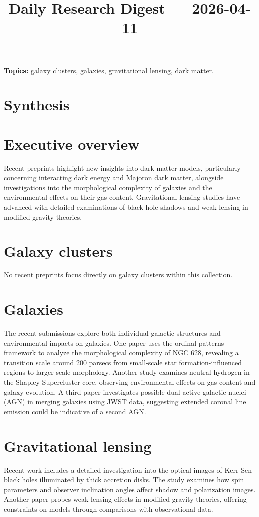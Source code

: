 \documentclass[11pt]{article}
\begin{document}
\title{Daily Research Digest --- 2026-04-11}
\author{}
\date{}
\maketitle
\textbf{Topics:} galaxy clusters, galaxies, gravitational lensing, dark matter.
\section*{Synthesis}
\section*{Executive overview}
Recent preprints highlight new insights into dark matter models, particularly concerning interacting dark energy and Majoron dark matter, alongside investigations into the morphological complexity of galaxies and the environmental effects on their gas content. Gravitational lensing studies have advanced with detailed examinations of black hole shadows and weak lensing in modified gravity theories.
\section*{Galaxy clusters}
No recent preprints focus directly on galaxy clusters within this collection.
\section*{Galaxies}
The recent submissions explore both individual galactic structures and environmental impacts on galaxies. One paper uses the ordinal patterns framework to analyze the morphological complexity of NGC 628, revealing a transition scale around 200 parsecs from small-scale star formation-influenced regions to larger-scale morphology. Another study examines neutral hydrogen in the Shapley Supercluster core, observing environmental effects on gas content and galaxy evolution. A third paper investigates possible dual active galactic nuclei (AGN) in merging galaxies using JWST data, suggesting extended coronal line emission could be indicative of a second AGN.
\section*{Gravitational lensing}
Recent work includes a detailed investigation into the optical images of Kerr-Sen black holes illuminated by thick accretion disks. The study examines how spin parameters and observer inclination angles affect shadow and polarization images. Another paper probes weak lensing effects in modified gravity theories, offering constraints on models through comparisons with observational data.
\end{document}
